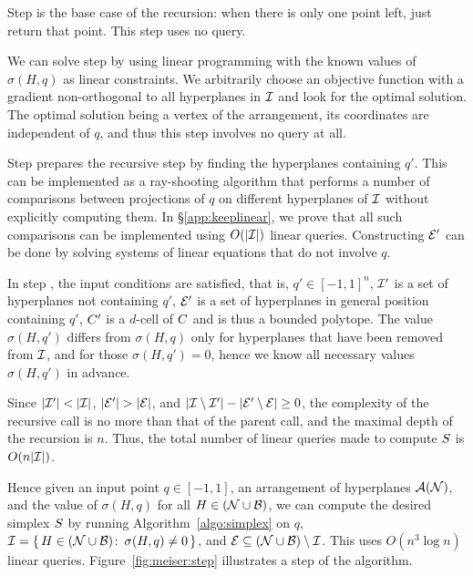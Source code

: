 Step  is the base case of the recursion: when there is only one point left, just return
that point. This step uses no query.

We can solve step  by using linear programming with the known values
of \(\sigma(H,q)\) as linear constraints. We arbitrarily choose an
objective function with a gradient non-orthogonal to all hyperplanes in
\(\mathcal{I}\) and look for the optimal solution. The optimal solution being a vertex of the arrangement,
its coordinates are independent of \(q\), and thus this step involves no query at all.

Step  prepares the recursive step by finding the hyperplanes containing
\(q'\). This can be implemented as a ray-shooting algorithm that performs
a number of comparisons between projections of $q$ on different hyperplanes of $\mathcal{I}$ without
explicitly computing them. In \S\ref{app:keeplinear}, we prove that all such comparisons
can be implemented using \(O(|{\mathcal{I}}|)\) linear queries.
Constructing \(\mathcal{E}'\) can be done by solving systems of linear
equations that do not involve \(q\).

In step , the input conditions are satisfied, that is, $q' \in
{[-1,1]}^n$, \(\mathcal{I}'\) is a set of hyperplanes not containing \(q'\), \(\mathcal{E}'\) is
a set of hyperplanes in general position containing \(q'\), \(C'\) is a
$d$-cell of \(C\) and is thus a bounded polytope. The value \(\sigma(H,q')\)
differs from \(\sigma(H,q)\) only for hyperplanes that have been removed from
\(\mathcal{I}\), and for those \(\sigma(H,q') = 0\), hence we know all necessary values
\(\sigma(H,q')\) in advance.

Since \(|{\mathcal{I}'}| < |{\mathcal{I}}|\), \(|{\mathcal{E}'}| > |{\mathcal{E}}|\), and
\(|{\mathcal{I}\setminus\mathcal{I}'}| - |{\mathcal{E}'\setminus\mathcal{E}}| \ge 0\), the complexity of the
recursive call is no more than that of the parent call, and the maximal depth
of the recursion is \(n\). Thus, the total number of
linear queries made to compute \(S\) is \(O(n|{\mathcal{I}}|)\).

Hence given an input point \(q \in [-1,1]\), an arrangement of hyperplanes
\(\mathcal{A}(\mathcal{N})\), and the value of \(\sigma(H,q)\) for all
\(H \in (\mathcal{N}\cup\mathcal{B})\), we can compute the desired simplex \(S\)
by running Algorithm~\ref{algo:simplex} on \(q\),
\(\mathcal{I}=\{\,H \in (\mathcal{N}\cup\mathcal{B}) \colon\, \sigma(H,q) \neq 0\,\}\), and
\(\mathcal{E} \subseteq (\mathcal{N}\cup\mathcal{B}) \setminus\mathcal{I}\).
This uses $O(n^3 \log n)$ linear queries.
Figure~\ref{fig:meiser:step} illustrates a step of the algorithm.

